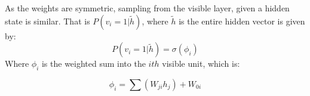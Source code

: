   As the weights are symmetric, sampling from the visible layer, given a hidden state is similar. That is $P(v_i = 1 | \tilde{h})$, where $\tilde{h}$ is the entire hidden vector is given by:
  \begin{equation}\label{eq:Vis-Gibbs-Update}
   P(v_i = 1 | \tilde{h}) = \sigma(\phi_{i})
  \end{equation}
  Where $\phi_i$ is the weighted sum into the $ith$ visible unit, which is:

  $$ \phi_i = \sum(W_{ji}h_{j}) + W_{0i} $$









